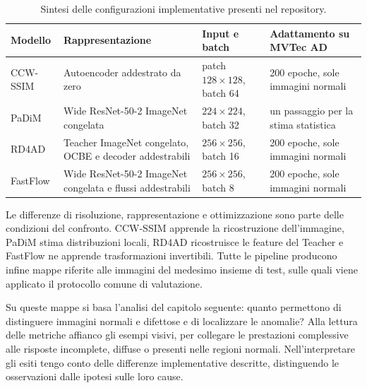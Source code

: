 \begin{table}[htbp]
    \centering
    \small
    \begin{tabularx}{\textwidth}{|P{1.7cm}|Y|P{2.1cm}|Y|}
        \hline
        \textbf{Modello} & \textbf{Rappresentazione} & \textbf{Input e batch} & \textbf{Adattamento su MVTec AD} \\
        \hline
        CCW-SSIM & Autoencoder addestrato da zero & patch $128\times128$, batch 64 & 200 epoche, sole immagini normali \\
        \hline
        PaDiM & Wide ResNet-50-2 ImageNet congelata & $224\times224$, batch 32 & un passaggio per la stima statistica \\
        \hline
        RD4AD & Teacher ImageNet congelato, OCBE e decoder addestrabili & $256\times256$, batch 16 & 200 epoche, sole immagini normali \\
        \hline
        FastFlow & Wide ResNet-50-2 ImageNet congelata e flussi addestrabili & $256\times256$, batch 8 & 200 epoche, sole immagini normali \\
        \hline
    \end{tabularx}
    \caption{Sintesi delle configurazioni implementative presenti nel repository.}
    \label{tab:cap3-configurazioni}
\end{table}

Le differenze di risoluzione, rappresentazione e ottimizzazione sono parte delle condizioni del confronto. CCW-SSIM apprende la ricostruzione dell’immagine, PaDiM stima distribuzioni locali, RD4AD ricostruisce le feature del Teacher e FastFlow ne apprende trasformazioni invertibili. Tutte le pipeline producono infine mappe riferite alle immagini del medesimo insieme di test, sulle quali viene applicato il protocollo comune di valutazione.

Su queste mappe si basa l'analisi del capitolo seguente: quanto permettono di distinguere immagini normali e difettose e di localizzare le anomalie? Alla lettura delle metriche affianco gli esempi visivi, per collegare le prestazioni complessive alle risposte incomplete, diffuse o presenti nelle regioni normali. Nell'interpretare gli esiti tengo conto delle differenze implementative descritte, distinguendo le osservazioni dalle ipotesi sulle loro cause.

